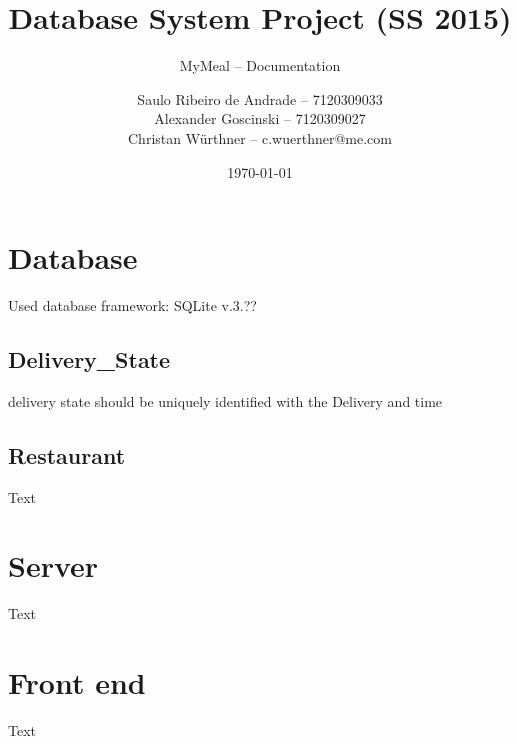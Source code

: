 \documentclass[parskip=half, a4paper, DIV=14]{scrartcl}
\begin{document}
\title{Database System Project (SS 2015)}
\subtitle{MyMeal -- Documentation}
\author{Saulo Ribeiro de Andrade -- 7120309033\\
		Alexander Goscinski -- 7120309027\\
		Christan Würthner -- c.wuerthner@me.com}
\date{\today}
\maketitle

\tableofcontents
\newpage


\section{Database}
Used database framework: SQLite v.3.??%

\subsection{Delivery_State}
delivery state should be uniquely identified with the Delivery and time

\subsection{Restaurant}
Text

\section{Server}
Text
\section{Front end}
Text
\end{document}

